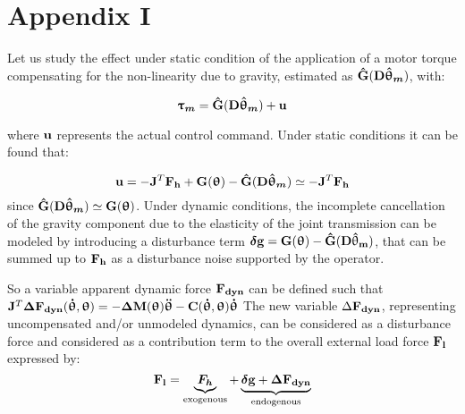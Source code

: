 \section{Appendix I}

Let us study the effect under static condition of the application of a motor torque compensating for the non-linearity due to gravity, estimated as 
$\mathbf{\hat{G}}(\mathbf{D} { \boldsymbol {\hat{\uptheta}_m}})$, with:

\begin{equation}
\vects{\uptau_m}=  \vect{\hat{G}}(\vectm{D} \vects{\hat{\uptheta}_m})+\vect{u}
\label{eq:inputForce}
\end{equation}

where  $\mathbf{u}$ represents the actual control command.
Under static conditions it can be found that:

\begin{equation}
\vect{u}=-  \vectm{J}^T \vect{F_h} +\vect{G}( \vects{\uptheta}) - \vect{\hat{G}}(\vectm{D} \vects{\hat{\uptheta}_m})  \simeq - \vectm{J}^T \vect{F_h}
\label{eq:inputInStaticCondition}
\end{equation}
since $\mathbf{\hat{G}}(\mathbf{D} { \boldsymbol {\hat{\uptheta}_m}}) \simeq \mathbf{G}( { \boldsymbol {\uptheta}})$. Under dynamic conditions, the incomplete cancellation of the gravity component due to the elasticity of the joint transmission can be modeled by introducing a disturbance term ${ \boldsymbol {\delta}} \mathbf{g}=\mathbf{G}( { \boldsymbol {\uptheta}}) - \mathbf{\hat{G}}(\mathbf{D} \mathbf{\hat{\uptheta}_m})$, that can be summed up 
to $\mathbf{F_h}$ as a disturbance noise supported by the operator.


So a variable apparent dynamic force $\mathbf{F_{dyn}}$ can be defined   such that
$\mathbf{J}^T { \boldsymbol {\Delta}} \mathbf{ F_{dyn}}( { \boldsymbol {\dot{\uptheta}}}, { \boldsymbol {\uptheta}})  =- { \boldsymbol {\Delta}} \mathbf{M} ( { \boldsymbol {\uptheta}}) { \boldsymbol {\ddot{\uptheta}}} - \mathbf{C}( { \boldsymbol {\dot{\uptheta}}}, { \boldsymbol {\uptheta}})  { \boldsymbol {\dot{\uptheta}}}  $
The new variable $\Delta \mathbf{F_{dyn}}$,  representing uncompensated and/or unmodeled dynamics, can be considered as a disturbance force and considered as a contribution term to the overall external load  force  $\mathbf{F_l}$ expressed by:
\begin{equation}
\vect{F_l}= \underbrace{\vects{F_h}}_{\text{exogenous}} +  \underbrace{\vects{\delta}\vect{g}  +  \vects{\Delta} \vect{F_{dyn}}}_{\text{endogenous}}
\label{eq:extraForces}
\end{equation}



